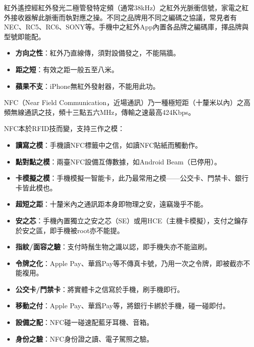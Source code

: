 
紅外遙控經紅外發光二極管發特定頻（通常38kHz）之紅外光脈衝信號，家電之紅外接收器解此脈衝而執對應之操。不同之品牌用不同之編碼之協議，常見者有NEC、RC5、RC6、SONY等。手機中之紅外App內置各品牌之編碼庫，擇品牌與型號即能配。


\begin{itemize}
  \item \textbf{方向之性}：紅外乃直線傳，須對設備發之，不能隔牆。
  \item \textbf{距之短}：有效之距一般五至八米。
  \item \textbf{蘋果不支}：iPhone無紅外發射器，不能用此功。
\end{itemize}


NFC（Near Field Communication，近場通訊）乃一種極短距（十釐米以內）之高頻無線通訊之技，頻十三點五六MHz，傳輸之速最高424Kbps。


NFC本於RFID技而變，支持三作之模：

\begin{itemize}
  \item \textbf{讀寫之模}：手機讀NFC標籤中之信，如讀NFC貼紙而觸動作。
  \item \textbf{點對點之模}：兩臺NFC設備互傳數據，如Android Beam（已停用）。
  \item \textbf{卡模擬之模}：手機模擬一智能卡，此乃最常用之模——公交卡、門禁卡、銀行卡皆此模也。
\end{itemize}


\begin{itemize}
  \item \textbf{超短之距}：十釐米內之通訊距本身即物理之安，遠竊幾乎不能。
  \item \textbf{安之芯}：手機內置獨立之安之芯（SE）或用HCE（主機卡模擬），支付之鑰存於安之區，即手機被root亦不能提。
  \item \textbf{指紋/面容之驗}：支付時鬚生物之識以認，即手機失亦不能盜刷。
  \item \textbf{令牌之化}：Apple Pay、華爲Pay等不傳真卡號，乃用一次之令牌，即被截亦不能複用。
\end{itemize}


\begin{itemize}
  \item \textbf{公交卡/門禁卡}：將實體卡之信寫於手機，刷手機即行。
  \item \textbf{移動之付}：Apple Pay、華爲Pay等，將銀行卡綁於手機，碰一碰即付。
  \item \textbf{設備之配}：NFC碰一碰速配藍牙耳機、音箱。
  \item \textbf{身份之驗}：NFC身份證之讀、電子駕照之驗。
\end{itemize}

